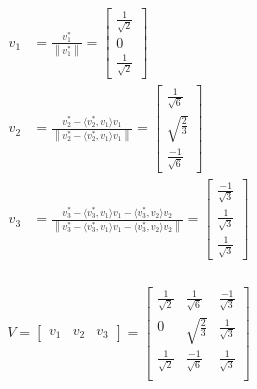 \documentclass[a4paper, spanish]{article}
\newcommand{\norm}[1]{\left\lVert#1\right\rVert}
\begin{document}
  \begin{align}
    v_1 &= \frac{v_1^*}{\norm{v_1^*}} =
    \begin{bmatrix}
      \frac{1}{\sqrt{2}} \\
      0 \\
      \frac{1}{\sqrt{2}}
    \end{bmatrix} \\
    v_2 &= \frac{v_2^* - \langle v_2^*,v_1 \rangle v_1}{\norm{v_2^* - \langle v_2^*,v_1 \rangle v_1}} =
    \begin{bmatrix}
      \frac{1}{\sqrt{6}} \\
      \sqrt{\frac{2}{3}} \\
      \frac{-1}{\sqrt{6}}
    \end{bmatrix} \\
    v_3 &= \frac{v_3^* - \langle v_3^*,v_1 \rangle v_1 - \langle v_3^*,v_2 \rangle v_2}{\norm{v_3^* - \langle v_3^*,v_1 \rangle v_1 - \langle v_3^*,v_2 \rangle v_2}} =
    \begin{bmatrix}
      \frac{-1}{\sqrt{3}} \\
      \frac{1}{\sqrt{3}} \\
      \frac{1}{\sqrt{3}}
    \end{bmatrix} \\
  \end{align}


  \begin{align}
    V =
    \begin{bmatrix}
      v_1 & v_2 & v_3
    \end{bmatrix} =
    \begin{bmatrix}
      \frac{1}{\sqrt{2}} & \frac{1}{\sqrt{6}} & \frac{-1}{\sqrt{3}} \\
      0 & \sqrt{\frac{2}{3}} &\frac{1}{\sqrt{3}} \\
      \frac{1}{\sqrt{2}} & \frac{-1}{\sqrt{6}} & \frac{1}{\sqrt{3}} \\
    \end{bmatrix}
  \end{align}
\end{document}
